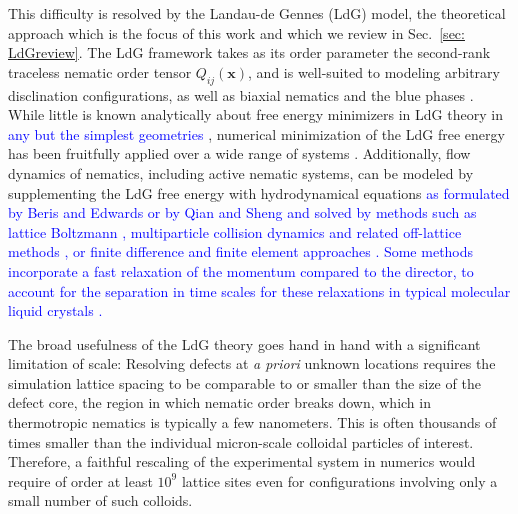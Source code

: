 \documentclass[utf8]{frontiersFPHY} %
\newcommand{\DAB}[1]{\textcolor{blue}{#1}}
\begin{document}
This difficulty is resolved by the Landau-de Gennes (LdG) model, the theoretical approach which is the focus of this work and which we review in Sec.~\ref{sec: LdGreview}.  The LdG framework takes as its order parameter the  second-rank traceless nematic order tensor $Q_{ij}(\mathbf{x})$, and is well-suited to modeling arbitrary disclination configurations, as well as biaxial nematics and the blue phases \cite{Ravnik2011,wright1989crystalline}.  While little is known analytically about free energy minimizers in LdG theory in \DAB{any but the simplest geometries} \cite{alama2016minimizers,alama2016analytical}, numerical minimization of the LdG free energy has been fruitfully applied over a wide range of systems \citep{nych2013assembly, Ravnik2007,Tkalec:2011lj,Ravnik2011,Kralj1992,tkalec2008interactions,emervsivc2019sculpting, luo2018tunable, tasinkevych2014dispersions, hashemi2015equilibrium, hung2009faceted, HungPRE2009, hung2006anisotropic,  beller2015shape, araki2006colloidal, Skarabot2008, eskandari2014particlesoftmatter, vskarabot2008hierarchical,  ravnik2009landau,Mori1999}. Additionally, flow dynamics of nematics, including active nematic systems, can be modeled by supplementing the LdG free energy with hydrodynamical equations \DAB{as formulated by Beris and Edwards \cite{beris1994thermodynamics} or by Qian and Sheng \cite{qian1998generalized} and solved by methods such as lattice Boltzmann \cite{denniston2001lattice,spencer2006lattice,2019arXiv190601129C,marenduzzo2007steady,cates2009lattice},  multiparticle collision dynamics and related off-lattice methods \cite{lee2015stochastic,shendruk2015multi,mandal2019multiparticle}, or finite difference and finite element approaches \cite{james2008computer,giomi2011excitable}. Some methods incorporate a fast relaxation of the momentum compared to the director,  to account for the separation in time scales for these relaxations in typical molecular liquid crystals \cite{svenvsek2002hydrodynamics,spencer2006lattice}.}


The broad usefulness of the LdG theory goes hand in hand with a significant limitation of scale: Resolving defects at \textit{a priori} unknown locations requires the simulation lattice spacing to be comparable to or smaller than the size of the defect core, the region in which nematic order breaks down, which in thermotropic nematics is typically a few nanometers. This is often thousands of times smaller than the individual micron-scale colloidal particles of interest. Therefore, a faithful rescaling of the experimental system in numerics would require of order at least $10^9$ lattice sites even for configurations involving only a small number of such colloids.
\end{document}
